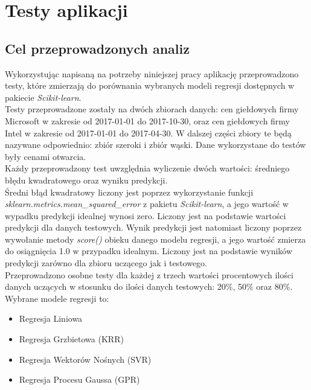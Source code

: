 
\chapter{Testy aplikacji}

\section{Cel przeprowadzonych analiz}

Wykorzystując napisaną na potrzeby niniejszej pracy aplikację przeprowadzono testy, które zmierzają do porównania wybranych modeli regresji dostępnych w pakiecie \textit{Scikit-learn}.\\

Testy przeprowadzone zostały na dwóch zbiorach danych: cen giełdowych firmy Microsoft w zakresie od 2017-01-01 do 2017-10-30, oraz cen giełdowych firmy Intel w zakresie od 2017-01-01 do 2017-04-30.
W dalszej części zbiory te będą nazywane odpowiednio: zbiór szeroki i zbiór wąski.
Dane wykorzystane do testów były cenami otwarcia.\\

Każdy przeprowadzony test uwzględnia wyliczenie dwóch wartości: średniego błędu kwadratowego oraz wyniku predykcji.\\

Średni błąd kwadratowy liczony jest poprzez wykorzystanie funkcji\\ \textit{sklearn.metrics.mean\_squared\_error} z pakietu \textit{Scikit-learn}, a jego wartość w wypadku predykcji idealnej wynosi zero.
Liczony jest na podstawie wartości predykcji dla danych testowych.
Wynik predykcji jest natomiast liczony poprzez wywołanie metody \textit{score()} obieku danego modelu regresji, a jego wartość zmierza do osiągnięcia 1.0 w przypadku idealnym.
Liczony jest na podstawie wyników predykcji zarówno dla zbioru uczącego jak i testowego.\\

Przeprowadzono osobne testy dla każdej z trzech wartości procentowych ilości danych uczących w stosunku do ilości danych testowych: 20\%, 50\% oraz 80\%.\\

Wybrane modele regresji to:
\begin{itemize}
 \item Regresja Liniowa
 \item Regresja Grzbietowa (KRR)
 \item Regresja Wektorów Nośnych (SVR)
 \item Regresja Procesu Gaussa (GPR)
\end{itemize}

